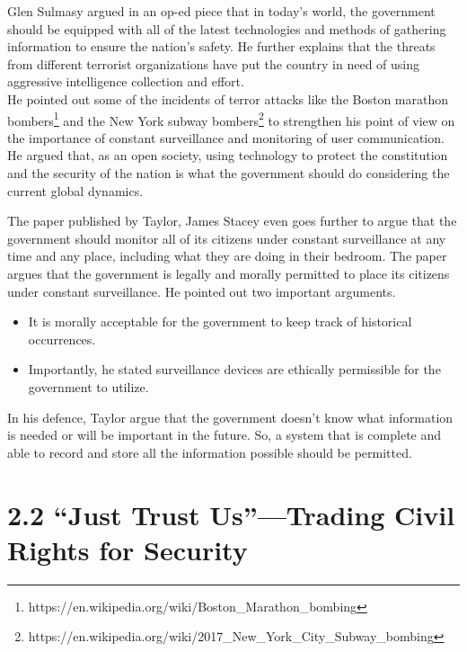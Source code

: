 \documentclass[11pt]{report}
\begin{document}
Glen Sulmasy \cite{sulmasy_2013} argued in an op-ed piece that in today's world, the government should be equipped with all of the latest technologies and methods of gathering information to ensure the nation's safety. He further explains that the threats from different terrorist organizations have put the country in need of using aggressive intelligence collection and effort. \\

He pointed out some of the incidents of terror attacks like the Boston marathon bombers\footnote{https://en.wikipedia.org/wiki/Boston\_Marathon\_bombing} and the New York subway bombers\footnote{https://en.wikipedia.org/wiki/2017\_New\_York\_City\_Subway\_bombing} to strengthen his point of view on the importance of constant surveillance and monitoring of user communication. He argued that, as an open society, using technology to protect the constitution and the security of the nation is what the government should do considering the current global dynamics.

The paper published by Taylor, James Stacey \cite{tyler} even goes further to argue that the government should monitor all of its citizens under constant surveillance at any time and any place, including what they are doing in their bedroom. The paper argues that the government is legally and morally permitted to place its citizens under constant surveillance. He pointed out two important arguments.

\begin{itemize}
  \item It is morally acceptable for the government to keep track of historical occurrences.
  \item Importantly, he stated surveillance devices are ethically permissible for the government to utilize.
\end{itemize}

In his defence, Taylor argue that the government doesn't know what information is needed or will be important in the future. So, a system that is complete and able to record and store all the information possible should be permitted.

\section*{2.2  “Just Trust Us”—Trading Civil Rights for Security}
\end{document}
